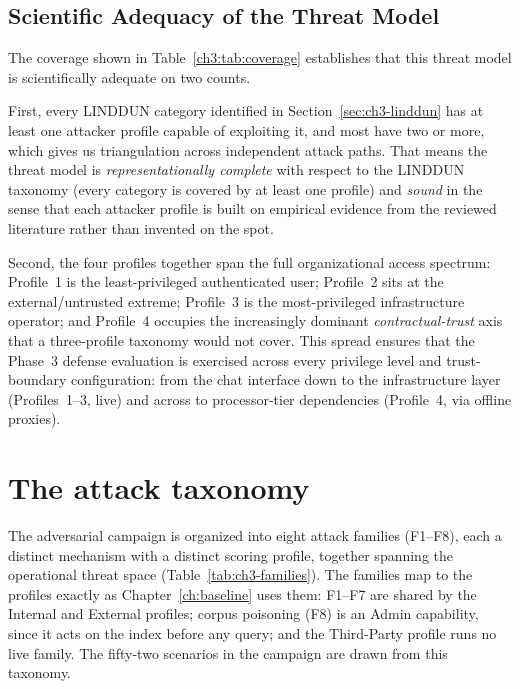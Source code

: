 \documentclass[12pt,a4paper]{report}
\begin{document}
\subsection{Scientific Adequacy of the Threat Model}

The coverage shown in Table~\ref{ch3:tab:coverage} establishes that
this threat model is scientifically adequate on two counts.

First, every LINDDUN category identified in Section~\ref{sec:ch3-linddun} has at least one
attacker profile capable of exploiting it, and most have two or more,
which gives us triangulation across independent attack paths. That means
the threat model is \emph{representationally complete} with respect to the
LINDDUN taxonomy (every category is covered by at least one profile) and
\emph{sound} in the sense that each attacker profile is
built on empirical evidence from the reviewed literature rather than
invented on the spot.

Second, the four profiles together span the full organizational access
spectrum: Profile~1 is the least-privileged authenticated user; Profile~2
sits at the external/untrusted extreme; Profile~3 is the most-privileged
infrastructure operator; and Profile~4 occupies the increasingly dominant
\emph{contractual-trust} axis that a three-profile taxonomy would not
cover. This spread ensures that the Phase~3 defense evaluation is exercised
across every privilege level and trust-boundary configuration: from the
chat interface down to the infrastructure layer (Profiles~1--3, live) and
across to processor-tier dependencies (Profile~4, via offline proxies).

\section{The attack taxonomy}
\label{sec:ch3-families}

The adversarial campaign is organized into eight attack families (F1--F8), each a distinct
mechanism with a distinct scoring profile, together spanning the operational threat space
(Table~\ref{tab:ch3-families}). The families map to the profiles exactly as
Chapter~\ref{ch:baseline} uses them: F1--F7 are shared by the Internal and External profiles;
corpus poisoning (F8) is an Admin capability, since it acts on the index before any query; and
the Third-Party profile runs no live family. The fifty-two scenarios in the campaign are drawn
from this taxonomy.
\end{document}
